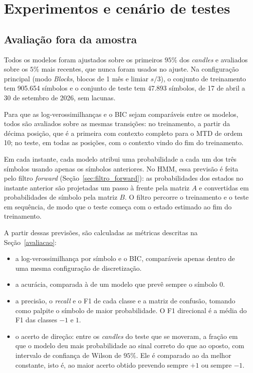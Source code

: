 \documentclass[
    12pt,                %
    openright,           %
    oneside,             %
    a4paper,             %
    english,             %
    brazil               %
]{abntex2}
\begin{document}
\section{Experimentos e cenário de testes}
\label{sec:experimentos}

\subsection{Avaliação fora da amostra}
\label{sec:avaliacao_fora}

Todos os modelos foram ajustados sobre os primeiros $95\%$ dos \textit{candles} e avaliados sobre os $5\%$ mais recentes, que nunca foram usados no ajuste. 
Na configuração principal (modo \textit{Blocks}, blocos de 1 mês e limiar $s/3$), o conjunto de treinamento tem 905.654 símbolos e o conjunto de 
teste tem 47.893 símbolos, de 17 de abril a 30 de setembro de 2026, sem lacunas.

Para que as log-verossimilhanças e o BIC sejam comparáveis entre os modelos, todos são avaliados sobre as mesmas transições: no treinamento, a 
partir da décima posição, que é a primeira com contexto completo para o MTD de ordem 10; no teste, em todas as posições, com o contexto vindo do fim do treinamento.

Em cada instante, cada modelo atribui uma probabilidade a cada um dos três símbolos usando apenas os símbolos anteriores. 
No HMM, essa previsão é feita pelo filtro \textit{forward} (Seção~\ref{sec:filtro_forward}): as probabilidades dos estados no instante anterior 
são projetadas um passo à frente pela matriz $A$ e convertidas em probabilidades de símbolo pela matriz $B$. O filtro percorre o treinamento e o teste em sequência, 
de modo que o teste começa com o estado estimado ao fim do treinamento.

A partir dessas previsões, são calculadas as métricas descritas na Seção~\ref{avaliacao}:
\begin{itemize}
    \item a log-verossimilhança por símbolo e o BIC, comparáveis apenas dentro de uma mesma configuração de discretização.
    \item a acurácia, comparada à de um modelo que prevê sempre o símbolo $0$.
    \item a precisão, o \textit{recall} e o F1 de cada classe e a matriz de confusão, tomando como palpite o símbolo de maior probabilidade. 
    O F1 direcional é a média do F1 das classes $-1$ e $1$.
    \item o acerto de direção: entre os \textit{candles} do teste que se moveram, a fração em que o modelo deu mais probabilidade ao sinal 
    correto do que ao oposto, com intervalo de confiança de Wilson de $95\%$. Ele é comparado ao da melhor constante, isto é, ao maior acerto obtido prevendo sempre $+1$ ou sempre $-1$.
\end{itemize}
\end{document}
